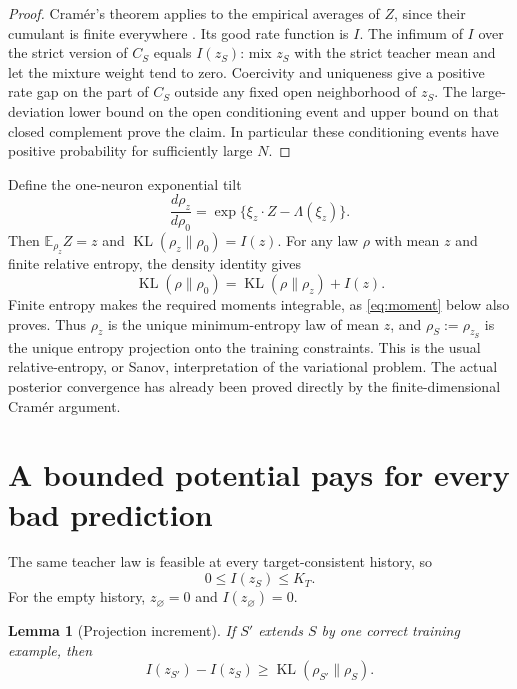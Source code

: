 \documentclass[11pt]{article}
\newtheorem{lemma}[theorem]{Lemma}
\newcommand{\E}{\mathbb E}
\newcommand{\KL}{\operatorname{KL}}
\begin{document}
\begin{proof}
Cram\'er's theorem applies to the empirical averages of $Z$, since their
cumulant is finite everywhere \cite[Theorem~2.2.30]{dembozeitouni}.
Its good rate function is $I$. The infimum of $I$ over the strict version
of $C_S$ equals $I(z_S)$: mix $z_S$ with the strict teacher mean and let
the mixture weight tend to zero. Coercivity and uniqueness give a
positive rate gap on the part of $C_S$ outside any fixed open
neighborhood of $z_S$. The large-deviation lower bound on the open
conditioning event and upper bound on that closed complement prove the
claim. In particular these conditioning events have positive probability
for sufficiently large $N$.
\end{proof}

Define the one-neuron exponential tilt
\begin{equation}\label{eq:tilt}
 \frac{d\rho_z}{d\rho_0}
   =\exp\{\xi_z\cdot Z-\Lambda(\xi_z)\}.
\end{equation}
Then $\E_{\rho_z}Z=z$ and $\KL(\rho_z\|\rho_0)=I(z)$. For any law
$\rho$ with mean $z$ and finite relative entropy, the density identity
gives
\begin{equation}\label{eq:KLidentity}
 \KL(\rho\|\rho_0)=\KL(\rho\|\rho_z)+I(z).
\end{equation}
Finite entropy makes the required moments integrable, as
\eqref{eq:moment} below also proves. Thus $\rho_z$ is the unique
minimum-entropy law of mean $z$, and $\rho_S:=\rho_{z_S}$ is the unique
entropy projection onto the training constraints. This is the usual
relative-entropy, or Sanov, interpretation of the variational problem.
The actual posterior convergence has already been proved directly by
the finite-dimensional Cram\'er argument.

\section{A bounded potential pays for every bad prediction}

The same teacher law is feasible at every target-consistent history, so
\begin{equation}\label{eq:budget}
 0\le I(z_S)\le K_T.
\end{equation}
For the empty history, $z_\varnothing=0$ and $I(z_\varnothing)=0$.

\begin{lemma}[Projection increment]\label{lem:projection}
If $S'$ extends $S$ by one correct training example, then
\begin{equation}\label{eq:increment}
 I(z_{S'})-I(z_S)\ge\KL(\rho_{S'}\|\rho_S).
\end{equation}
\end{lemma}
\end{document}
